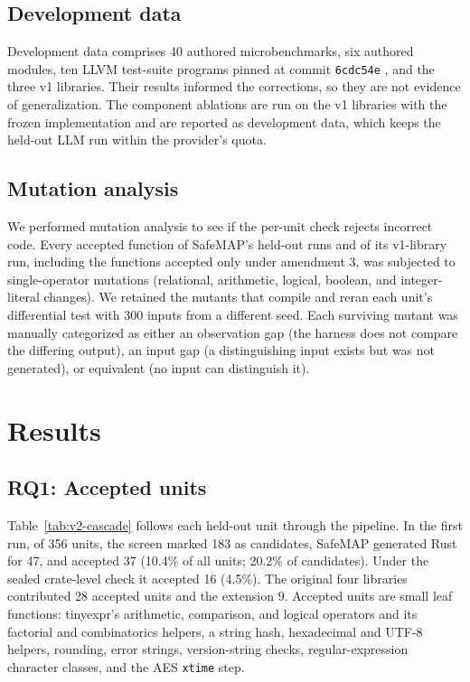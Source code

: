 \documentclass[pdflatex,sn-basic]{sn-jnl}
\newcommand{\tool}{SafeMAP\xspace}
\begin{document}
\subsection{Development data}

Development data comprises 40 authored microbenchmarks, six authored modules,
ten LLVM test-suite programs pinned at commit \texttt{6cdc54e}
\citep{llvmtestsuite}, and the three v1 libraries. Their results informed the
corrections, so they are not evidence of generalization. The component
ablations are run on the v1 libraries with the frozen implementation and are
reported as development data, which keeps the held-out LLM run within the
provider's quota.

\subsection{Mutation analysis}

We performed mutation analysis \citep{jia2011mutation} to see if the per-unit 
check rejects incorrect code. Every accepted function of \tool's held-out 
runs and of its v1-library run, including the functions accepted only under 
amendment 3, was subjected to single-operator mutations (relational, arithmetic, 
logical, boolean, and integer-literal changes). We retained the mutants that compile 
and reran each unit's differential test with 300 inputs from a different seed. 
Each surviving mutant was manually categorized as either an observation gap (the 
harness does not compare the differing output), an input gap (a distinguishing input 
exists but was not generated), or equivalent (no input can distinguish it).

\section{Results}
\label{sec:results}

\subsection{RQ1: Accepted units}
\label{sec:rq1}

Table~\ref{tab:v2-cascade} follows each held-out unit through the pipeline.
In the first run, of 356 units, the screen marked 183 as candidates, \tool
generated Rust for 47, and accepted 37 (10.4\% of all units; 20.2\% of
candidates). Under the sealed crate-level check it accepted 16 (4.5\%). The
original four libraries contributed 28 accepted units and the extension 9.
Accepted units are small leaf functions: tinyexpr's arithmetic, comparison,
and logical operators and its factorial and combinatorics helpers, a string
hash, hexadecimal and UTF-8 helpers, rounding, error strings, version-string
checks, regular-expression character classes, and the AES \texttt{xtime} step.
\end{document}

